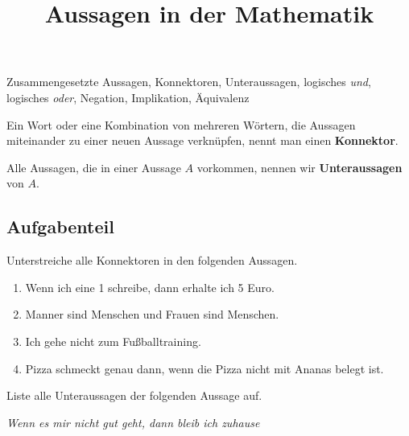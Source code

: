 \documentclass{uebungsblatt}
\title{Aussagen in der Mathematik}
\begin{document}
\maketitle
\begin{contents}
    Zusammengesetzte Aussagen, Konnektoren, Unteraussagen, logisches \emph{und}, logisches \emph{oder}, Negation, Implikation, Äquivalenz
\end{contents}


\begin{definition}
    Ein Wort oder eine Kombination von mehreren Wörtern, die Aussagen miteinander zu einer neuen Aussage verknüpfen, nennt man einen \textbf{Konnektor}.
\end{definition}

\begin{definition}
    Alle Aussagen, die in einer Aussage $A$ vorkommen, nennen wir \textbf{Unteraussagen} von $A$.
    \end{definition}

\subsection*{Aufgabenteil}

\begin{exercise}

    Unterstreiche alle Konnektoren in den folgenden Aussagen.

        \begin{enumerate}[label=\alph*)]
            \item Wenn ich eine 1 schreibe, dann erhalte ich 5 Euro.
            \item Manner sind Menschen und Frauen sind Menschen.
            \item Ich gehe nicht zum Fußballtraining.
            \item Pizza schmeckt genau dann, wenn die Pizza nicht mit Ananas belegt ist.
        \end{enumerate}

\end{exercise}

\begin{exercise}

    Liste alle Unteraussagen der folgenden Aussage auf.

    \begin{center}
        \emph{Wenn es mir nicht gut geht, dann bleib ich zuhause}
    \end{center}

    \begin{answerbox}[1in]

    \end{answerbox}

\end{exercise}
\end{document}
